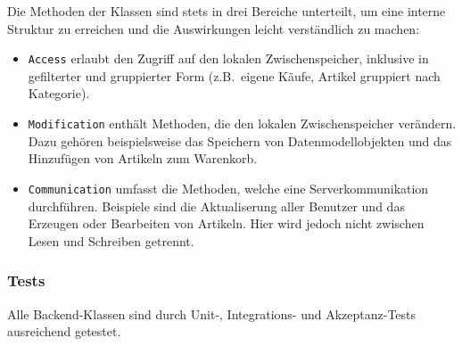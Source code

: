Die Methoden der Klassen sind stets in drei Bereiche unterteilt, um eine interne Struktur zu erreichen und die Auswirkungen leicht verständlich zu machen:

\begin{itemize}
	\item \texttt{Access} erlaubt den Zugriff auf den lokalen Zwischenspeicher, inklusive in gefilterter und gruppierter Form (z.B.\ eigene Käufe, Artikel gruppiert nach Kategorie).
	\item \texttt{Modification} enthält Methoden, die den lokalen Zwischenspeicher verändern.
	Dazu gehören beispielsweise das Speichern von Datenmodellobjekten und das Hinzufügen von Artikeln zum Warenkorb.
	\item \texttt{Communication} umfasst die Methoden, welche eine Serverkommunikation durchführen.
	Beispiele sind die Aktualiserung aller Benutzer und das Erzeugen oder Bearbeiten von Artikeln.
	Hier wird jedoch nicht zwischen Lesen und Schreiben getrennt.
\end{itemize}

\subsubsection{Tests}

Alle Backend-Klassen sind durch Unit-, Integrations- und Akzeptanz-Tests ausreichend getestet.
